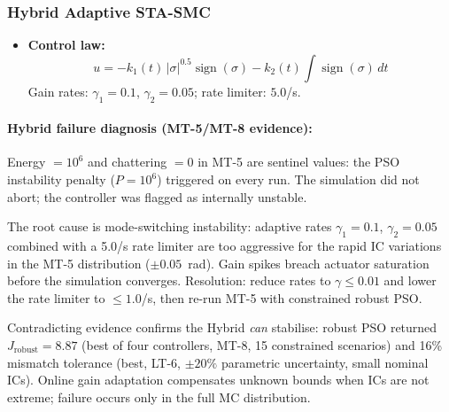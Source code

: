 \documentclass[10pt, a4paper]{article}
\newcommand{\sign}{\operatorname{sign}}
\begin{document}
\subsubsection{Hybrid Adaptive STA-SMC}

\begin{itemize}[leftmargin=1.5em,itemsep=0.2em]
  \item \textbf{Control law:}
  \begin{equation}
    u = -k_1(t)\,|\sigma|^{0.5}\sign(\sigma) - k_2(t)\int\sign(\sigma)\,dt
    \label{eq:hybrid}
  \end{equation}
  Gain rates: $\gamma_1=0.1$, $\gamma_2=0.05$; rate limiter: $5.0$/s.
\end{itemize}

\noindent{}

\paragraph{Hybrid failure diagnosis (MT-5/MT-8 evidence):}

Energy $= 10^6$ and chattering $= 0$ in MT-5 are sentinel values: the PSO
instability penalty ($P = 10^6$) triggered on every run.  The simulation did
not abort; the controller was flagged as internally unstable.

The root cause is mode-switching instability: adaptive rates $\gamma_1{=}0.1$,
$\gamma_2{=}0.05$ combined with a 5.0/s rate limiter are too aggressive for
the rapid IC variations in the MT-5 distribution ($\pm0.05$~rad).  Gain
spikes breach actuator saturation before the simulation converges.  Resolution:
reduce rates to $\gamma \le 0.01$ and lower the rate limiter to $\le1.0$/s,
then re-run MT-5 with constrained robust PSO.

Contradicting evidence confirms the Hybrid \emph{can} stabilise: robust PSO
returned $J_\text{robust}{=}8.87$ (best of four controllers, MT-8, 15
constrained scenarios) and 16\% mismatch tolerance (best, LT-6, $\pm20\%$
parametric uncertainty, small nominal ICs).  Online gain adaptation compensates
unknown bounds when ICs are not extreme; failure occurs only in the full MC
distribution.
\end{document}
